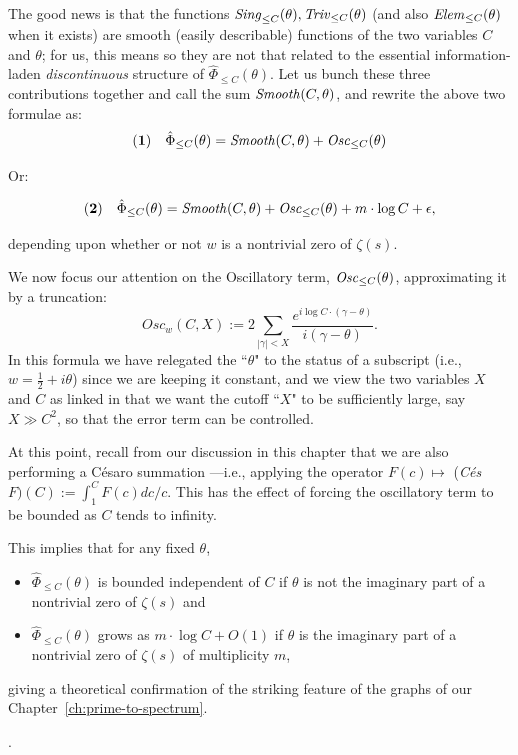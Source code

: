 \documentclass[openany]{book}
\theoremstyle{plain}
\theoremstyle{definition}
\begin{document}
{                     The good news is that  the functions ${\it Sing}_{\le C}(\theta),  {\it Triv}_{\le C}(\theta)$ (and also ${\it Elem}_{\le C}(\theta)$ when it exists) are smooth (easily describable) functions of the two variables $C$ and $\theta$; for us, this means so they are not that related to the essential information-laden {\it discontinuous} structure of  $ {\hat \Phi}_{\le C}(\theta)$. Let us bunch these three contributions together and call the sum ${\it Smooth}(C,\theta)$, and rewrite the above two formulae as:
                       $$ {\bf(1)}\ \ \ {\hat \Phi}_{\le C}(\theta) ={\it Smooth}(C,\theta) +  {\it Osc}_{\le C}(\theta) $$

           Or:

           $${\bf(2)}\ \ \ {\hat \Phi}_{\le C}(\theta) = {\it Smooth}(C,\theta)+  {\it Osc}_{\le C}(\theta) +  m\cdot \log C +\epsilon,$$

           depending upon whether or not $w$ is a nontrivial zero of $\zeta(s)$.


 We now focus our attention on the Oscillatory term,  ${\it Osc}_{\le C}(\theta) $, approximating it by a truncation:  $$Osc_w(C,X):=  2\sum_{|\gamma| <
 X} {{\frac{e^{i\log C\cdot (\gamma-\theta)}}{i(\gamma-\theta)}}}.$$ In this formula we have relegated the ``$\theta$" to the status of  a subscript (i.e., $w = {\frac{1}{2}} +i\theta$) since we are keeping it constant, and we view the two variables $X$ and $C$ as linked in that we want the cutoff ``$X$" to be sufficiently large, say $X \gg C^2$, so that the error term can be controlled.

 At this point, recall  from our discussion in  this chapter that we are also performing a C{\'e}saro summation ---i.e.,  applying the operator $F(c) \mapsto$ ({\it C{\'e}s}$F)(C):= \int_1^CF(c) dc/c.$
This has the effect of forcing the oscillatory term to be bounded as $C$ tends to infinity.

 This implies that for any fixed $\theta$,  \begin{itemize} \item ${\hat \Phi}_{\le C}(\theta)$  is bounded independent of $C$  if  $\theta$ is not the imaginary part of a nontrivial zero of $\zeta(s)$  and
 \item ${\hat \Phi}_{\le C}(\theta)$ grows as $m\cdot \log C +O(1)$ if $\theta$ is the imaginary part of a nontrivial zero of $\zeta(s)$ of multiplicity $m$, \end{itemize} giving a theoretical confirmation of the striking feature of the graphs of our Chapter~\ref{ch:prime-to-spectrum}.}.
\end{document}

